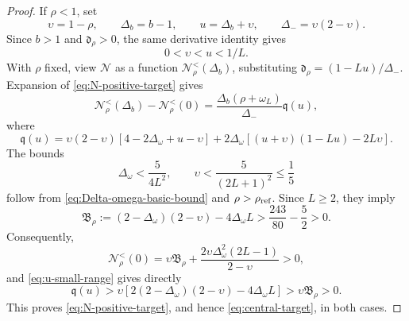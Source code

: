 \documentclass[preprints,article,accept,oneauthor]{Definitions/mdpi}
\numberwithin{equation}{section}
\theoremstyle{mdpi}
\theoremstyle{definition}
\begin{document}
\begin{proof}
If \(\rho<1\), set
\[
 \upsilon=1-\rho,\qquad \Delta_b=b-1,\qquad
 u=\Delta_b+\upsilon,\qquad \Delta_-=\upsilon(2-\upsilon).
\]
Since \(b>1\) and \(\mathfrak d_\rho>0\), the same derivative identity gives
\begin{equation}\label{eq:u-small-range}
 0<\upsilon<u<1/L.
\end{equation}
With \(\rho\) fixed, view \(\mathcal N\) as a function
\(\mathcal N_\rho^{<}(\Delta_b)\), substituting
\(\mathfrak d_\rho=(1-Lu)/\Delta_-\).
Expansion of \eqref{eq:N-positive-target} gives
\[
 \mathcal N_\rho^{<}(\Delta_b)-\mathcal N_\rho^{<}(0)
 =\frac{\Delta_b(\rho+\omega_L)}{\Delta_-}\mathfrak q(u),
\]
where
\[
 \mathfrak q(u)=\upsilon(2-\upsilon)
 [4-2\Delta_\omega+u-\upsilon]
 +2\Delta_\omega[(u+\upsilon)(1-Lu)-2L\upsilon].
\]
The bounds
\begin{equation}\label{eq:Delta-upsilon-bounds}
 \Delta_\omega<\frac5{4L^2},\qquad
 \upsilon<\frac5{(2L+1)^2}\leq\frac15
\end{equation}
follow from \eqref{eq:Delta-omega-basic-bound} and
\(\rho>\rho_{\rm ref}\).  Since \(L\geq2\), they imply
\[
 \mathfrak B_\rho:=(2-\Delta_\omega)(2-\upsilon)-4\Delta_\omega L
 >\frac{243}{80}-\frac52>0.
\]
Consequently,
\[
 \mathcal N_\rho^{<}(0)
 =\upsilon\mathfrak B_\rho
 +\frac{2\upsilon\Delta_\omega^2(2L-1)}{2-\upsilon}>0,
\]
and \eqref{eq:u-small-range} gives directly
\[
 \mathfrak q(u)
 >\upsilon[2(2-\Delta_\omega)(2-\upsilon)-4\Delta_\omega L]
 >\upsilon\mathfrak B_\rho>0.
\]
This proves \eqref{eq:N-positive-target}, and hence
\eqref{eq:central-target}, in both cases.


\end{proof}
\end{document}
